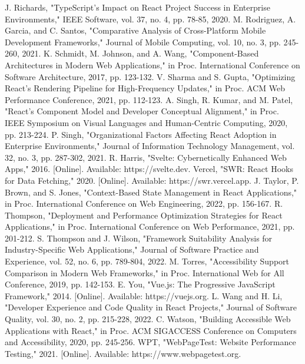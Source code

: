 \begin{thebibliography}{00}
 J. Richards, "TypeScript's Impact on React Project Success in Enterprise Environments," IEEE Software, vol. 37, no. 4, pp. 78-85, 2020.
 M. Rodriguez, A. Garcia, and C. Santos, "Comparative Analysis of Cross-Platform Mobile Development Frameworks," Journal of Mobile Computing, vol. 10, no. 3, pp. 245-260, 2021.
 K. Schmidt, M. Johnson, and A. Wang, "Component-Based Architectures in Modern Web Applications," in Proc. International Conference on Software Architecture, 2017, pp. 123-132.
 V. Sharma and S. Gupta, "Optimizing React's Rendering Pipeline for High-Frequency Updates," in Proc. ACM Web Performance Conference, 2021, pp. 112-123.
 A. Singh, R. Kumar, and M. Patel, "React's Component Model and Developer Conceptual Alignment," in Proc. IEEE Symposium on Visual Languages and Human-Centric Computing, 2020, pp. 213-224.
 P. Singh, "Organizational Factors Affecting React Adoption in Enterprise Environments," Journal of Information Technology Management, vol. 32, no. 3, pp. 287-302, 2021.
 R. Harris, "Svelte: Cybernetically Enhanced Web Apps," 2016. [Online]. Available: https://svelte.dev.
 Vercel, "SWR: React Hooks for Data Fetching," 2020. [Online]. Available: https://swr.vercel.app.
 J. Taylor, P. Brown, and S. Jones, "Context-Based State Management in React Applications," in Proc. International Conference on Web Engineering, 2022, pp. 156-167.
 R. Thompson, "Deployment and Performance Optimization Strategies for React Applications," in Proc. International Conference on Web Performance, 2021, pp. 201-212.
 S. Thompson and J. Wilson, "Framework Suitability Analysis for Industry-Specific Web Applications," Journal of Software Practice and Experience, vol. 52, no. 6, pp. 789-804, 2022.
 M. Torres, "Accessibility Support Comparison in Modern Web Frameworks," in Proc. International Web for All Conference, 2019, pp. 142-153.
 E. You, "Vue.js: The Progressive JavaScript Framework," 2014. [Online]. Available: https://vuejs.org.
 L. Wang and H. Li, "Developer Experience and Code Quality in React Projects," Journal of Software Quality, vol. 30, no. 2, pp. 215-228, 2022.
 C. Watson, "Building Accessible Web Applications with React," in Proc. ACM SIGACCESS Conference on Computers and Accessibility, 2020, pp. 245-256.
 WPT, "WebPageTest: Website Performance Testing," 2021. [Online]. Available: https://www.webpagetest.org.

\end{thebibliography}
